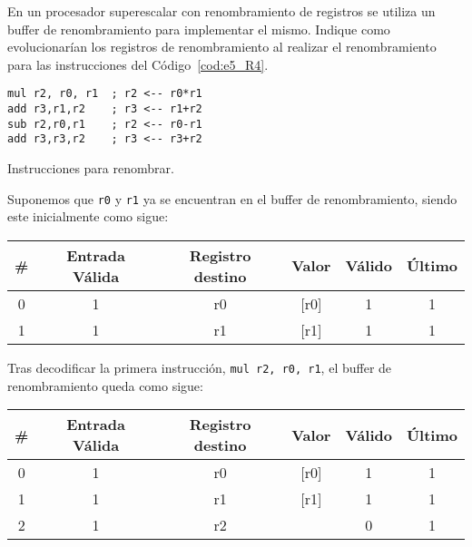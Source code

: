 \begin{ejercicio}
    En un procesador superescalar con renombramiento de registros se utiliza un buffer de renombramiento para implementar el mismo. Indique como evolucionarían los registros de renombramiento al realizar el renombramiento para las instrucciones del Código~\ref{cod:e5_R4}.
    \begin{listing}[H]
    \begin{verbatim}
mul r2, r0, r1  ; r2 <-- r0*r1
add r3,r1,r2    ; r3 <-- r1+r2
sub r2,r0,r1    ; r2 <-- r0-r1
add r3,r3,r2    ; r3 <-- r3+r2
    \end{verbatim}
    \caption{Instrucciones para renombrar.}
    \label{cod:e5_R4}
    \end{listing}

    Suponemos que \verb|r0| y \verb|r1| ya se encuentran en el buffer de renombramiento, siendo este inicialmente como sigue:
    \begin{center}
        \scriptsize
        \begin{tabular}{|c|c|c|c|c|c|}
            \hline
            \# & Entrada Válida & Registro destino & Valor & Válido & Último \\
            \hline
            0 & 1 & r0 & [r0] & 1 & 1 \\
            1 & 1 & r1 & [r1] & 1 & 1 \\
            \hline
        \end{tabular}
    \end{center}

    Tras decodificar la primera instrucción, \verb|mul r2, r0, r1|, el buffer de renombramiento queda como sigue:
    \begin{center}
        \scriptsize
        \begin{tabular}{|c|c|c|c|c|c|}
            \hline
            \# & Entrada Válida & Registro destino & Valor & Válido & Último \\
            \hline
            0 & 1 & r0 & [r0] & 1 & 1 \\
            1 & 1 & r1 & [r1] & 1 & 1 \\
            2 & 1 & r2 &  & 0 & 1 \\
            \hline
        \end{tabular}
    \end{center}


\end{ejercicio}
